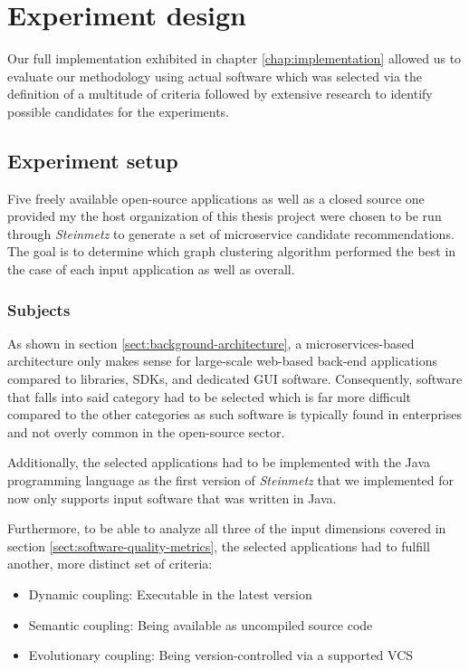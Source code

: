 \documentclass[12pt,a4paper]{report}
\begin{document}
\chapter{Experiment design} \label{chap:experiment-design}

Our full implementation exhibited in chapter \ref{chap:implementation} allowed us
to evaluate our methodology using actual software which was selected via the
definition of a multitude of criteria followed by extensive research to identify
possible candidates for the experiments.



\section{Experiment setup}

Five freely available open-source applications as well as a closed source one
provided my the host organization of this thesis project were chosen to be run through
\textit{Steinmetz} to generate a set of microservice candidate recommendations.
The goal is to determine which graph clustering algorithm performed the best in the case
of each input application as well as overall.


\subsection{Subjects}

As shown in section \ref{sect:background-architecture}, a microservices\hyp based
architecture only makes sense for large\hyp scale web\hyp based back\hyp end
applications compared to libraries, SDKs, and dedicated GUI software.
Consequently, software that falls into said category had to be selected which
is far more difficult compared to the other categories as such software is
typically found in enterprises and not overly common in the open-source sector.

Additionally, the selected applications had to be implemented with the Java
programming language as the first version of \textit{Steinmetz} that we implemented
for now only supports input software that was written in Java.

Furthermore, to be able to analyze all three of the input dimensions covered in
section \ref{sect:software-quality-metrics}, the selected applications had to fulfill
another, more distinct set of criteria:

\begin{itemize}[noitemsep]
    \item Dynamic coupling: Executable in the latest version
    \item Semantic coupling: Being available as uncompiled source code
    \item Evolutionary coupling: Being version-controlled via a supported VCS
\end{itemize}
\end{document}
